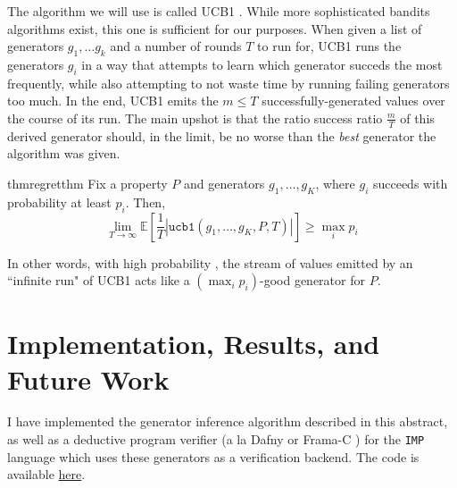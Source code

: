 \documentclass[sigconf,nonacm,review,anonymous]{acmart}
\begin{document}
The algorithm we will use is called UCB1 \cite{auer2002finite}. While more sophisticated
bandits algorithms exist, this one is sufficient for our purposes. When given a list of generators
$g_1,\dots g_k$ and a number of rounds $T$ to run for, UCB1 runs the generators $g_i$ in a way that attempts
to learn which generator succeds the most frequently, while also attempting to not waste time by running
failing generators too much. In the end, UCB1 emits the $m \leq T$ successfully-generated values over the course of its run.
The main upshot is that the ratio success ratio $\frac{m}{T}$ of this derived generator should, in the limit,
be no worse than the \emph{best} generator the algorithm was given. 
\begin{restatable}{thm}{regretthm}
Fix a property $P$ and generators $g_1,\dots,g_K$, where $g_i$ succeeds with probability at least $p_i$. Then,
\vspace{-2px}
\[
\lim_{T \to \infty} \mathbb{E}\left[\frac{1}{T}\left|\texttt{ucb1}(g_1,\dots,g_K,P,T)\right|\right] \geq \max_i p_i
\]
\end{restatable}
In other words, with high probability
, the stream of values
emitted by an ``infinite run" of UCB1 acts like a $(\max_i p_i)$-good
generator for $P$.


\section{Implementation, Results, and Future Work}
\label{sec:impl}

I have implemented the generator inference algorithm described in this abstract,
as well as a deductive program verifier (a la Dafny or Frama-C \cite{??}) for the
\texttt{IMP} language which uses these generators as a verification backend.
The code is available \href{https://github.com/jdublu10/triple-testing}{here}.
\end{document}
